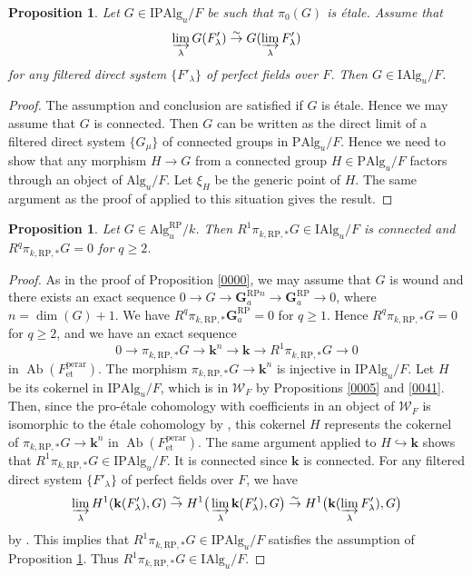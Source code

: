 \documentclass{amsart}
\newtheorem{Prop}[Thm]{Proposition}
\theoremstyle{remark}
\numberwithin{equation}{section}
\newcommand{\into}{\hookrightarrow}
\newcommand{\isomto}{\overset{\sim}{\to}}
\newcommand{\et}{\mathrm{et}}
\newcommand{\Ga}{\mathbf{G}_{a}}
\newcommand{\dirlim}{\varinjlim}
\newcommand{\perar}{\mathrm{perar}}
\newcommand{\Alg}{\mathrm{Alg}}
\newcommand{\Ind}{\mathrm{I}}
\newcommand{\Pro}{\mathrm{P}}
\newcommand{\alg}[1]{\mathbf{#1}}
\newcommand{\RP}{\mathrm{RP}}
\DeclareMathOperator{\Ab}{Ab}
\begin{document}
\begin{Prop} \label{0001}
	Let $G \in \Ind \Pro \Alg_{u} / F$ be such that $\pi_{0}(G)$ is \'etale.
	Assume that
		\[
				\dirlim_{\lambda} G(F'_{\lambda})
			\isomto
				G(\dirlim_{\lambda} F'_{\lambda})
		\]
	for any filtered direct system $\{F'_{\lambda}\}$ of perfect fields over $F$.
	Then $G \in \Ind \Alg_{u} / F$.
\end{Prop}

\begin{proof}
	The assumption and conclusion are satisfied if $G$ is \'etale.
	Hence we may assume that $G$ is connected.
	Then $G$ can be written as the direct limit of a filtered direct system $\{G_{\mu}\}$
	of connected groups in $\Pro \Alg_{u} / F$.
	Hence we need to show that any morphism $H \to G$
	from a connected group $H \in \Pro \Alg_{u} / F$
	factors through an object of $\Alg_{u} / F$.
	Let $\xi_{H}$ be the generic point of $H$.
	The same argument as the proof of \cite[Lemma (3.4.4)]{Suz20} applied to this situation
	gives the result.
\end{proof}

\begin{Prop} \label{0004}
	Let $G \in \Alg^{\RP}_{u} / k$.
	Then $R^{1} \pi_{k, \RP, \ast} G \in \Ind \Alg_{u} / F$ is connected
	and $R^{q} \pi_{k, \RP, \ast} G = 0$ for $q \ge 2$.
\end{Prop}

\begin{proof}
	As in the proof of Proposition \ref{0000},
	we may assume that $G$ is wound and there exists an exact sequence
	$0 \to G \to \Ga^{\RP n} \to \Ga^{\RP} \to 0$, where $n = \dim(G) + 1$.
	We have $R^{q} \pi_{k, \RP, \ast} \Ga^{\RP} = 0$ for $q \ge 1$.
	Hence $R^{q} \pi_{k, \RP, \ast} G = 0$ for $q \ge 2$,
	and we have an exact sequence
		\[
				0
			\to
				\pi_{k, \RP, \ast} G
			\to
				\alg{k}^{n}
			\to
				\alg{k}
			\to
				R^{1} \pi_{k, \RP, \ast} G
			\to
				0
		\]
	in $\Ab(F^{\perar}_{\et})$.
	The morphism $\pi_{k, \RP, \ast} G \to \alg{k}^{n}$ is injective in $\Ind \Pro \Alg_{u} / F$.
	Let $H$ be its cokernel in $\Ind \Pro \Alg_{u} / F$,
	which is in $\mathcal{W}_{F}$ by Propositions \ref{0005} and \ref{0041}.
	Then, since the pro-\'etale cohomology with coefficients in an object of $\mathcal{W}_{F}$
	is isomorphic to the \'etale cohomology by \cite[Proposition 3.1.2]{Suz24},
	this cokernel $H$ represents the cokernel of $\pi_{k, \RP, \ast} G \to \alg{k}^{n}$
	in $\Ab(F^{\perar}_{\et})$.
	The same argument applied to $H \into \alg{k}$ shows that
	$R^{1} \pi_{k, \RP, \ast} G \in \Ind \Pro \Alg_{u} / F$.
	It is connected since $\alg{k}$ is connected.
	For any filtered direct system $\{F'_{\lambda}\}$ of perfect fields over $F$,
	we have
		\[
				\dirlim_{\lambda}
					H^{1}(\alg{k}(F'_{\lambda}), G)
			\isomto
				H^{1} \bigr(
					\dirlim_{\lambda}
						\alg{k}(F'_{\lambda}),
					G
				\bigr)
			\isomto
				H^{1} \bigl(
					\alg{k}(\dirlim_{\lambda} F'_{\lambda}),
					G
				\bigr)
		\]
	by \cite[Proposition 3.5.3 (2)]{GGMB14}.
	This implies that
	$R^{1} \pi_{k, \RP, \ast} G \in \Ind \Pro \Alg_{u} / F$ satisfies
	the assumption of Proposition \ref{0001}.
	Thus $R^{1} \pi_{k, \RP, \ast} G \in \Ind \Alg_{u} / F$.
\end{proof}
\end{document}
